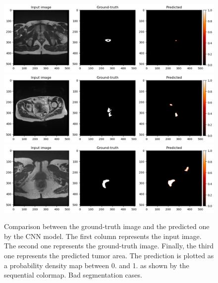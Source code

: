 \documentclass{standalone}
\begin{document}
\begin{figure}[htp]

    \centering
    \includegraphics[width=\textwidth]{../images/predoutputwrong.png}
    \includegraphics[width=\textwidth]{../images/predoutputwrong1.png}
    \includegraphics[width=\textwidth]{../images/predoutputwrong2.png}
    

    \caption{Comparison between the ground-truth image and the predicted one by the CNN model. The first column represents the input image. 
    The second one represents the ground-truth image. 
    Finally, the third one represents the predicted tumor area.
    The prediction is plotted as a probability density map between 0. and 1. as shown by the sequential colormap.
    Bad segmentation cases.}\label{predwrong}

\end{figure}
\end{document}
